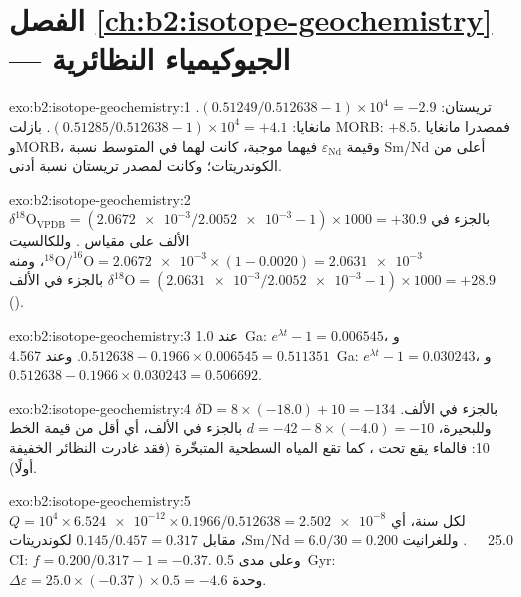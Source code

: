 \section*{الفصل \ref{ch:b2:isotope-geochemistry} --- الجيوكيمياء النظائرية}

\begin{solution}{exo:b2:isotope-geochemistry:1}
تريستان: $(0.51249/0.512638 - 1)\times10^4 = -2.9$. مانغايا: $(0.51285/0.512638 -
1)\times10^4 = +4.1$. بازلت MORB: $+8.5$. فمصدرا مانغايا وMORB، وقيمة
$\varepsilon_{\mathrm{Nd}}$ فيهما موجبة، كانت لهما في المتوسط نسبة Sm/Nd أعلى من الكوندريتات؛
وكانت لمصدر تريستان نسبة أدنى.
\end{solution}

\begin{solution}{exo:b2:isotope-geochemistry:2}
$\delta^{18}\mathrm{O}_{\mathrm{VPDB}} = (\num{2.0672e-3}/\num{2.0052e-3} - 1)\times1000 =
+30.9$ بالجزء في الألف على مقياس . وللكالسيت $^{18}\mathrm{O}/^{16}\mathrm{O} =
\num{2.0672e-3}\times(1 - 0.0020) = \num{2.0631e-3}$، ومنه $\delta^{18}\mathrm{O} =
(\num{2.0631e-3}/\num{2.0052e-3} - 1)\times1000 = +28.9$ بالجزء في الألف ().
\end{solution}

\begin{solution}{exo:b2:isotope-geochemistry:3}
عند \qty{1.0}{Ga}: $e^{\lambda t} - 1 = 0.006545$، و$0.512638 - 0.1966\times0.006545 =
0.511351$. وعند \qty{4.567}{Ga}: $e^{\lambda t}-1 = 0.030243$، و$0.512638 -
0.1966\times0.030243 = 0.506692$.
\end{solution}

\begin{solution}{exo:b2:isotope-geochemistry:4}
$\delta\mathrm{D} = 8\times(-18.0) + 10 = -134$ بالجزء في الألف. وللبحيرة، $d = -42 -
8\times(-4.0) = -10$ بالجزء في الألف، أي أقل من قيمة الخط 10: فالماء يقع تحت ، كما تقع المياه السطحية المتبخّرة (فقد غادرت النظائر الخفيفة أولًا).
\end{solution}

\begin{solution}{exo:b2:isotope-geochemistry:5}
$Q = 10^4\times\num{6.524e-12}\times0.1966/0.512638 = \num{2.502e-8}$ لكل سنة، أي
\qty{25.0}{\per\giga\year}. وللغرانيت $\mathrm{Sm}/\mathrm{Nd} = 6.0/30 = 0.200$،
مقابل $0.145/0.457 = 0.317$ لكوندريتات CI: $f = 0.200/0.317 - 1 = -0.37$. وعلى مدى
\qty{0.5}{Gyr}: $\Delta\varepsilon = 25.0\times(-0.37)\times0.5 = -4.6$ وحدة.
\end{solution}

